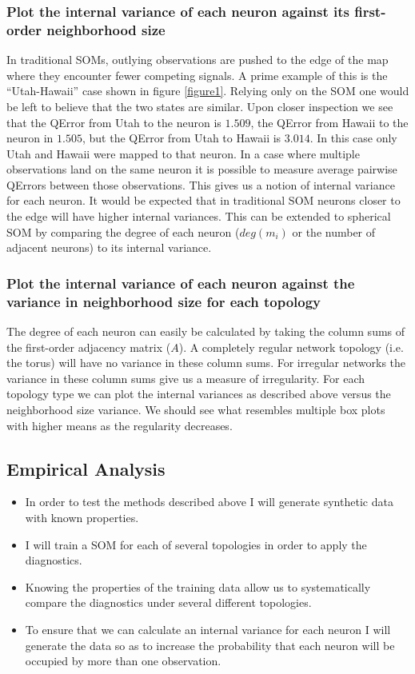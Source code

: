 \documentclass[10pt,titlepage]{article}
\begin{document}
\subsubsection{Plot the internal variance of each neuron against its first-order neighborhood size}
In traditional SOMs, outlying observations are pushed to the edge of the map where
they encounter fewer competing signals. A prime example of this is the
``Utah-Hawaii'' case shown in figure \ref{figure1}.  Relying only on the SOM one
would be left to believe that the two states are similar. Upon closer inspection we see
that the QError from Utah to the neuron is $1.509$, the QError from Hawaii to
the neuron in $1.505$, but the QError from Utah to Hawaii is $3.014$. In this
case only Utah and Hawaii were mapped to that neuron.  In a case where multiple
observations land on the same neuron it is possible to measure average pairwise
QErrors between those observations.  This gives us a notion of internal variance for
each neuron. It would be expected that in traditional SOM neurons closer to the
edge will have higher internal variances. This can be extended to spherical SOM
by comparing the degree of each neuron ($deg(m_i)$ or the number of adjacent
neurons) to its internal variance.

\subsubsection{Plot the internal variance of each neuron against the variance in neighborhood size for each topology}
The degree of each neuron can easily be calculated by taking the column sums of
the first-order adjacency matrix ($A$).  A completely regular network
topology (i.e. the torus) will have no variance in these column sums.  For
irregular networks the variance in these column sums give us a measure of
irregularity.  For each topology type we can plot the internal
variances as described above versus the neighborhood size variance.  We should see
what resembles multiple box plots with higher means as the regularity decreases. 

\subsection{Empirical Analysis}
\begin{itemize}
\item In order to test the methods described above I will generate synthetic data with
known properties.
\item I will train a SOM for each of several topologies in order to apply the
diagnostics.
\item Knowing the properties of the training data allow us to systematically
compare the diagnostics under several different topologies.
\item To ensure that we can calculate an internal variance for
each neuron I will generate the data so as to increase the
probability that each neuron will be occupied by more than one observation.
\end{itemize}
\end{document}
